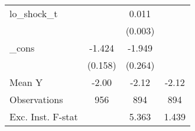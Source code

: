 {\begin{tabular}{l*{3}{c}}
\addlinespace
lo\_shock\_t  &                     &       0.011\sym{***}&                     \\
            &                     &     (0.003)         &                     \\
\addlinespace
\_cons      &      -1.424\sym{***}&      -1.949\sym{***}&                     \\
            &     (0.158)         &     (0.264)         &                     \\
\midrule
Mean Y      &       -2.00         &       -2.12         &       -2.12         \\
Observations&         956         &         894         &         894         \\
Exc. Inst. F-stat&                     &       5.363         &       1.439         \\
\bottomrule
\end{tabular}
}
